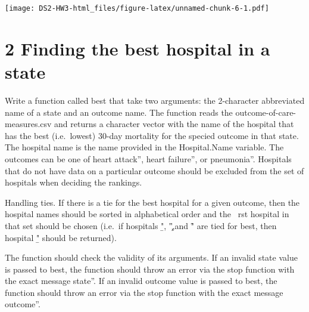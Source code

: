 \documentclass[
]{article}
\begin{document}
\texttt{[image: DS2-HW3-html\_files/figure-latex/unnamed-chunk-6-1.pdf]}

\hypertarget{finding-the-best-hospital-in-a-state}{%
\section{2 Finding the best hospital in a
state}\label{finding-the-best-hospital-in-a-state}}

Write a function called best that take two arguments: the 2-character
abbreviated name of a state and an outcome name. The function reads the
outcome-of-care-measures.csv and returns a character vector with the
name of the hospital that has the best (i.e.~lowest) 30-day mortality
for the specied outcome in that state. The hospital name is the name
provided in the Hospital.Name variable. The outcomes can be one of heart
attack'', heart failure'', or pneumonia''. Hospitals that do not have
data on a particular outcome should be excluded from the set of
hospitals when deciding the rankings.

Handling ties. If there is a tie for the best hospital for a given
outcome, then the hospital names should be sorted in alphabetical order
and the  rst hospital in that set should be chosen (i.e.~if hospitals
\b", \c",and \f" are tied for best, then hospital \b" should be
returned).

The function should check the validity of its arguments. If an invalid
state value is passed to best, the function should throw an error via
the stop function with the exact message \invalid state''. If an invalid
outcome value is passed to best, the function should throw an error via
the stop function with the exact message \invalid outcome''.
\end{document}
